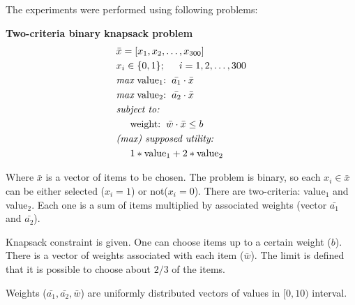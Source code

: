 The experiments were performed using following problems:
\begin{description}
  \item{\textbf{Two-criteria binary knapsack problem}}
    \begin{align*}
      & \bar{x} = [x_1, x_2, \dots, x_{300}]  \\
      & x_i \in \{0, 1\};  \hspace{0.5cm} i = 1, 2, \dots, 300 \\
      & \textit{max}\text{ value$_1$:} \hspace{0.2cm} \bar{a_1} \cdot \bar{x} \\
      & \textit{max}\text{ value$_2$:} \hspace{0.2cm} \bar{a_2} \cdot \bar{x} \\
      & \textit{subject to:} \\
      & \hspace{0.5cm} \text{weight:} \hspace{0.2cm} \bar{w} \cdot \bar{x}
      \leq b \\
      & \textit{(max) supposed utility:} \\
      & \hspace{0.5cm} 1*\text{value}_1 + 2*\text{value}_2
    \end{align*}
    
    Where $\bar{x}$ is a vector of items to be chosen. The problem is binary,
    so each $x_i \in \bar{x}$ can be either selected ($x_i = 1$) or not($x_i
    = 0$). There are two-criteria: value$_1$ and value$_2$. Each one is a sum
    of items multiplied by associated weights (vector $\bar{a_1}$ and
    $\bar{a_2}$).

    Knapsack constraint is given. One can choose items up to a certain weight
    ($b$). There is a vector of weights associated with each item
    ($\bar{w}$). The limit is defined that it is possible to choose about
    $2/3$ of the items.

    Weights ($\bar{a_1}, \bar{a_2}, \bar{w}$) are uniformly distributed
    vectors of values in $[0,10)$ interval.



\end{description}
